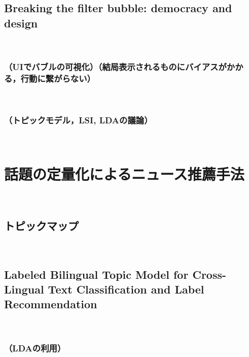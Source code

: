 \documentclass[12pt,a4j]{jreport}
\begin{document}
\subsection{Breaking the filter bubble: democracy and design}
~

\subsubsection{（UIでバブルの可視化）（結局表示されるものにバイアスがかかる，行動に繋がらない）}
~




\subsubsection{（トピックモデル，LSI, LDAの議論）}
~

\section{話題の定量化によるニュース推薦手法}
~

\subsection{トピックマップ}
~

\subsection{Labeled Bilingual Topic Model for Cross-Lingual Text Classification and Label Recommendation}
~

\subsubsection{（LDAの利用）}
~

~
\end{document}
